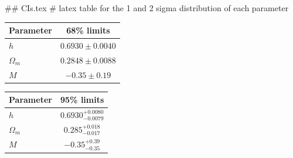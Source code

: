 ## CIs.tex
# latex table for the 1 and 2 sigma distribution of each parameter

\begin{tabular} { l  c}
 Parameter &  68\% limits\\
\hline
{\boldmath$h              $} & $0.6930\pm 0.0040          $\\
{\boldmath$\Omega_m       $} & $0.2848\pm 0.0088          $\\
{\boldmath$M              $} & $-0.35\pm 0.19             $\\
\hline
\end{tabular}

\begin{tabular} { l  c}
 Parameter &  95\% limits\\
\hline
{\boldmath$h              $} & $0.6930^{+0.0080}_{-0.0079}$\\
{\boldmath$\Omega_m       $} & $0.285^{+0.018}_{-0.017}   $\\
{\boldmath$M              $} & $-0.35^{+0.39}_{-0.35}     $\\
\hline
\end{tabular}
